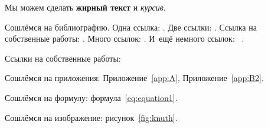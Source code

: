 Мы можем сделать \textbf{жирный текст} и \textit{курсив}.


Сошлёмся на библиографию.
Одна ссылка: \cite[с.~54]{Sokolov}\cite[с.~36]{Methodology}.
Две ссылки: \cite{Sokolov,Gaidaenko}.
Ссылка на собственные работы: \cite{Sokolov, Gaidaenko}.
Много ссылок: %
\cite{Lermontov, Management, Borozda, Marketing, Constitution, FamilyCode,
	Gost.7.0.53, Razumovski, Lagkueva, Pokrovski, Methodology, Berestova,
	Kriger}%
%
.
И~ещё немного ссылок:~\cite{Article,Book,Booklet,Conference,Inbook,Incollection,Manual,Mastersthesis,
	Misc,Phdthesis,Proceedings,Techreport,Unpublished}
\cite{medvedev2006jelektronnye, CEAT:CEAT581, doi:10.1080/01932691.2010.513279,
	Gosele1999161,Li2007StressAnalysis, Shoji199895, test:eisner-sample,
	test:eisner-sample-shorted, AB_patent_Pomerantz_1968, iofis_patent1960}
%
.

%

Ссылки на собственные работы:~\cite{Sokolov, Gaidaenko}

Сошлёмся на приложения: Приложение~\cref{app:A}, Приложение~\cref{app:B2}.

Сошлёмся на формулу: формула~\cref{eq:equation1}.

Сошлёмся на изображение: рисунок~\cref{fig:knuth}.

